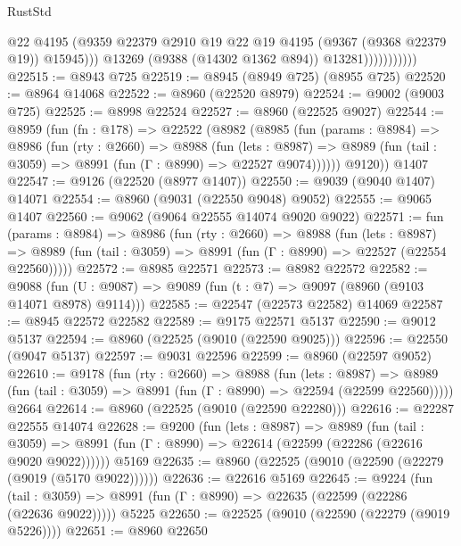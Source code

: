 \begin{lexlean}{RustStd}
\begin{coremodule}
                              @22
                              @4195
                              (@9359
                                @22379
                                @2910
                                @19
                                @22
                                @19
                                @4195
                                (@9367 (@9368 @22379 @19))
                                @15945)))
                          @13269
                          (@9388 (@14302 @1362 @894))
                          @13281)))))))))))
@22515 := @8943 @725
@22519 := @8945 (@8949 @725) (@8955 @725)
@22520 := @8964 @14068
@22522 := @8960 (@22520 @8979)
@22524 := @9002 (@9003 @725)
@22525 := @8998 @22524
@22527 := @8960 (@22525 @9027)
@22544 := @8959
    (fun (fn : @178) =>
    @22522
      (@8982
        (@8985
          (fun (params : @8984) =>
          @8986
            (fun (rty : @2660) =>
            @8988
              (fun (lets : @8987) =>
              @8989 (fun (tail : @3059) => @8991 (fun (Γ : @8990) => @22527 @9074))))))
        @9120))
    @1407
@22547 := @9126 (@22520 (@8977 @1407))
@22550 := @9039 (@9040 @1407) @14071
@22554 := @8960 (@9031 (@22550 @9048) @9052)
@22555 := @9065 @1407
@22560 := @9062 (@9064 @22555 @14074 @9020 @9022)
@22571 := fun (params : @8984) =>
  @8986
    (fun (rty : @2660) =>
    @8988
      (fun (lets : @8987) =>
      @8989 (fun (tail : @3059) => @8991 (fun (Γ : @8990) => @22527 (@22554 @22560)))))
@22572 := @8985 @22571
@22573 := @8982 @22572
@22582 := @9088
    (fun (U : @9087) => @9089 (fun (t : @7) => @9097 (@8960 (@9103 @14071 @8978) @9114)))
@22585 := @22547 (@22573 @22582) @14069
@22587 := @8945 @22572 @22582
@22589 := @9175 @22571 @5137
@22590 := @9012 @5137
@22594 := @8960 (@22525 (@9010 (@22590 @9025)))
@22596 := @22550 (@9047 @5137)
@22597 := @9031 @22596
@22599 := @8960 (@22597 @9052)
@22610 := @9178
    (fun (rty : @2660) =>
    @8988
      (fun (lets : @8987) =>
      @8989 (fun (tail : @3059) => @8991 (fun (Γ : @8990) => @22594 (@22599 @22560)))))
    @2664
@22614 := @8960 (@22525 (@9010 (@22590 @22280)))
@22616 := @22287 @22555 @14074
@22628 := @9200
    (fun (lets : @8987) =>
    @8989
      (fun (tail : @3059) =>
      @8991 (fun (Γ : @8990) => @22614 (@22599 (@22286 (@22616 @9020 @9022))))))
    @5169
@22635 := @8960 (@22525 (@9010 (@22590 (@22279 (@9019 (@5170 @9022))))))
@22636 := @22616 @5169
@22645 := @9224
    (fun (tail : @3059) => @8991 (fun (Γ : @8990) => @22635 (@22599 (@22286 (@22636 @9022)))))
    @5225
@22650 := @22525 (@9010 (@22590 (@22279 (@9019 @5226))))
@22651 := @8960 @22650

\end{coremodule}
\end{lexlean}
